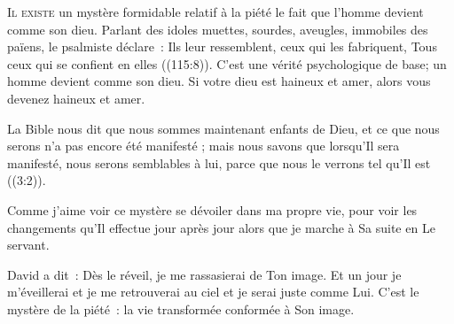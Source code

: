 


\lettrine{I}{l existe} un mystère formidable relatif à la piété
 \ocadr le fait que l'homme devient comme son dieu.
 Parlant des idoles muettes, sourdes, aveugles, immobiles des païens,
 le psalmiste déclare~: 
 \Og Ils leur ressemblent, ceux qui les fabriquent,
 Tous ceux qui se confient en elles \Fg{} ((115:8)).
 C'est une vérité psychologique de base;
 un homme devient comme son dieu.
 Si votre dieu est haineux et amer, alors vous devenez haineux et amer.


La Bible nous dit que \Og nous 
 sommes maintenant enfants de Dieu, et ce que nous serons n'a pas encore
 été manifesté ; mais nous savons que lorsqu'Il sera manifesté,
 nous serons semblables à lui, parce que nous le verrons
 tel qu'Il est \Fg{} ((3:2)).

Comme j'aime voir ce mystère se dévoiler dans ma propre vie,
 pour voir les changements qu'Il effectue jour après jour
 alors que je marche à Sa suite en Le servant.

David a dit~: 
 \Og Dès le réveil, je me rassasierai de Ton image. \Fg{}
 Et un jour je m'éveillerai et je me retrouverai au ciel
 et je serai juste comme Lui. C'est le mystère de la piété~:
 la vie transformée conformée à Son image.

\dvrule






